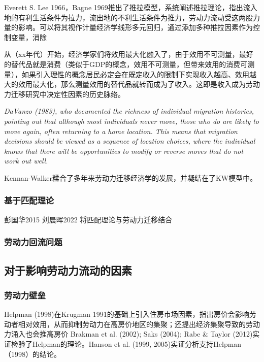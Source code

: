 \documentclass[10pt,a4paper]{article}
\begin{document}
Everett S. Lee 1966，Bagne 1969推出了推拉模型，系统阐述推拉理论，指出流入地的有利生活条件为拉力，流出地的不利生活条件为推力，劳动力流动受这两股力量的影响。可以将其视作计量经济学线形多元回归，通过添加多种推拉因素作为控制变量，消除

从（xx年代）开始，经济学家们将效用最大化融入了，由于效用不可测量，最好的替代品就是消费（类似于GDP的概念，效用不可测量，但带来效用的消费可测量），如果引入理性的概念居民必定会在既定收入的限制下实现收入越高、效用越大的效用最大化，那么测量效用的替代品就转而成为了收入。这即是收入成为劳动力迁移研究中决定性因素的历史脉络。


\textit{DaVanzo (1983), who documented the richness  of individual migration histories, pointing out that although most individuals never move,  those who do are likely to move again, often returning to a home location. This means  that migration decisions should be viewed as a sequence of location choices, where the  individual knows that there will be opportunities to modify or reverse moves that do not  work out well.}

Kennan-Walker糅合了多年来劳动力迁移经济学的发展，并凝结在了KW模型中。

\subsubsection{基于匹配理论}
彭国华2015
刘晨晖2022
将匹配理论与劳动力迁移结合



\subsubsection{劳动力回流问题}





\subsection{对于影响劳动力流动的因素}

\subsubsection{劳动力壁垒}

Helpman (1998)在Krugman 1991的基础上引入住房市场因素，指出房价会影响劳动者相对效用，从而抑制劳动力在高房价地区的集聚；还提出经济集聚导致的劳动力涌入也会推高房价
Brakman et al. (2002); Saks (2004); Rabe \& Taylor (2012)实证检验了Helpman的理论。Hanson et al. (1999, 2005)实证分析支持Helpman（1998）的结论。
\end{document}
